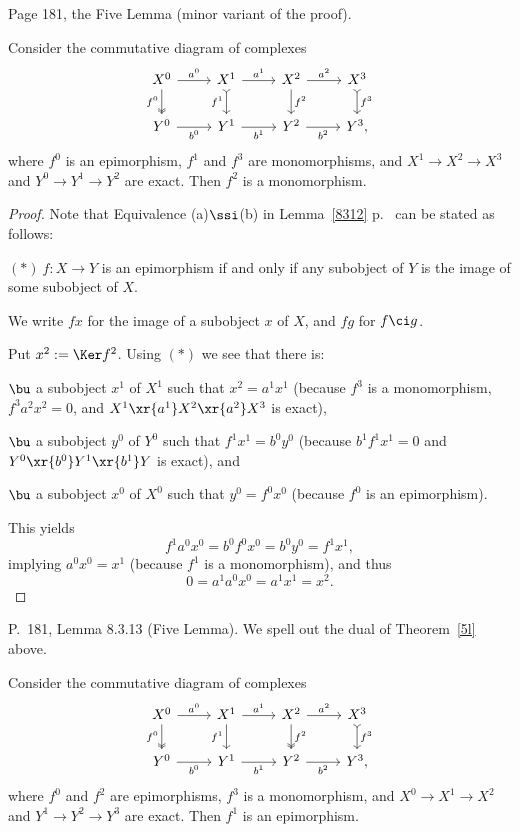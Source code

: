 \documentclass[12pt]{article}
\theoremstyle{remark}
\theoremstyle{definition}
\begin{document}
\begin{s} 
Page 181, the Five Lemma (minor variant of the proof). 

\begin{thm}
Consider the commutative diagram of complexes 
$$
\begin{tikzcd}
X^0\ar[two heads]{d}[swap]{f^0}\ar{r}{a^0}&
X^1\ar[tail]{d}[swap]{f^1}\ar{r}{a^1}&
X^2\ar{d}{f^2}\ar{r}{a^2}&
X^3\ar[tail]{d}{f^3}\\ 
Y^0\ar{r}[swap]{b^0}&
Y^1\ar{r}[swap]{b^1}&
Y^2\ar{r}[swap]{b^2}&
Y^3,
\end{tikzcd}
$$
where $f^0$ is an epimorphism, $f^1$ and $f^3$ are monomorphisms, and $X^1\to X^2\to X^3$ and $Y^0\to Y^1\to Y^2$ are exact. Then $f^2$ is a monomorphism. 
\end{thm} 

\begin{proof}
Note that Equivalence (a)$\ssi$(b) in Lemma~\ref{8312} p.~ can be stated as follows: 

\nn$(*)\ f:X\to Y$ is an epimorphism if and only if any subobject of $Y$ is the image of some subobject of $X$. 

We write $fx$ for the image of a subobject $x$ of $X$, and $fg$ for $f\ci g$.

Put $x^2:=\Ker f^2$. Using $(*)$ we see that there is: 

\nn$\bu$ a subobject $x^1$ of $X^1$ such that $x^2=a^1x^1$ (because $f^3$ is a monomorphism, $f^3a^2x^2=0$, and $X^1\xr{a^1}X^2\xr{a^2}X^3$ is exact), 

\nn$\bu$ a subobject $y^0$ of $Y^0$ such that $f^1x^1=b^0y^0$ (because $b^1f^1x^1=0$ and $Y^0\xr{b^0}Y^1\xr{b^1}Y$ is exact), and 

\nn$\bu$ a subobject $x^0$ of $X^0$ such that $y^0=f^0x^0$ (because $f^0$ is an epimorphism). 

This yields 
$$
f^1a^0x^0=b^0f^0x^0=b^0y^0=f^1x^1,
$$
implying $a^0x^0=x^1$ (because $f^1$ is a monomorphism), and thus 
$$
0=a^1a^0x^0=a^1x^1=x^2.
$$ 
\end{proof}
\end{s}

%

\begin{s} 
P.~181, Lemma 8.3.13 (Five Lemma). We spell out the dual of Theorem~\ref{5l} above.
\begin{thm} 
Consider the commutative diagram of complexes 
$$
\begin{tikzcd}
X^0\ar[two heads]{d}[swap]{f^0}\ar{r}{a^0}&
X^1\ar{d}[swap]{f^1}\ar{r}{a^1}&
X^2\ar[two heads]{d}{f^2}\ar{r}{a^2}&
X^3\ar[tail]{d}{f^3}\\ 
Y^0\ar{r}[swap]{b^0}&
Y^1\ar{r}[swap]{b^1}&
Y^2\ar{r}[swap]{b^2}&
Y^3,
\end{tikzcd}
$$
where $f^0$ and $f^2$ are epimorphisms, $f^3$ is a monomorphism, and $X^0\to X^1\to X^2$ and $Y^1\to Y^2\to Y^3$ are exact. Then $f^1$ is an epimorphism. 
\end{thm}
\end{s}
\end{document}
